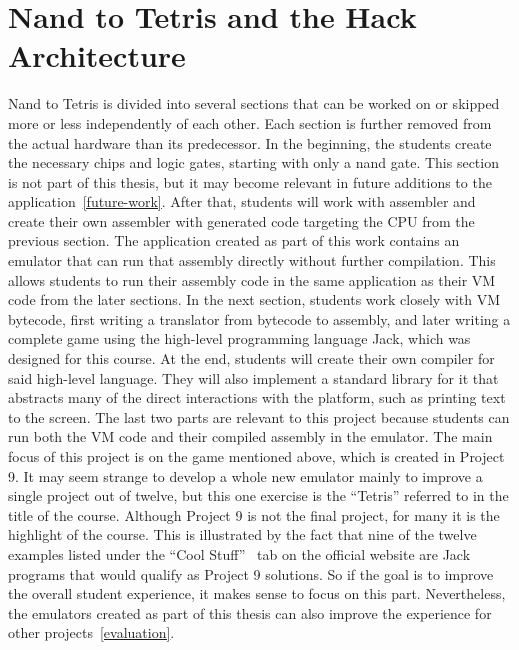 \section{Nand to Tetris and the Hack Architecture} \label{hack-architecture}
Nand to Tetris is divided into several sections that can be worked on or skipped more or less independently of each other.
Each section is further removed from the actual hardware than its predecessor.
In the beginning, the students create the necessary chips and logic gates, starting with only a nand gate.
This section is not part of this thesis, but it may become relevant in future additions to the application~\ref{future-work}.
After that, students will work with assembler and create their own assembler with generated code targeting the CPU from the previous section.
The application created as part of this work contains an emulator that can run that assembly directly without further compilation.
This allows students to run their assembly code in the same application as their VM code from the later sections.
In the next section, students work closely with VM bytecode, first writing a translator from bytecode to assembly, and later writing a complete game using the high-level programming language Jack, which was designed for this course.
At the end, students will create their own compiler for said high-level language.
They will also implement a standard library for it that abstracts many of the direct interactions with the platform, such as printing text to the screen.
The last two parts are relevant to this project because students can run both the VM code and their compiled assembly in the emulator.
The main focus of this project is on the game mentioned above, which is created in Project 9.
It may seem strange to develop a whole new emulator mainly to improve a single project out of twelve, but this one exercise is the ``Tetris'' referred to in the title of the course.
Although Project 9 is not the final project, for many it is the highlight of the course.
This is illustrated by the fact that nine of the twelve examples listed under the ``Cool Stuff''~\cite{n2tweb} tab on the official website are Jack programs that would qualify as Project 9 solutions.
So if the goal is to improve the overall student experience, it makes sense to focus on this part.
Nevertheless, the emulators created as part of this thesis can also improve the experience for other projects~\ref{evaluation}.


